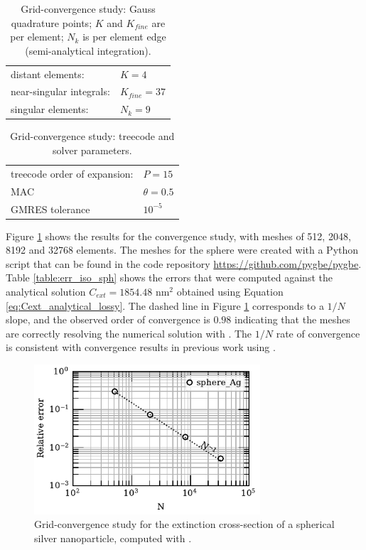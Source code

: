 \begin{table}[h]
    \centering
    \caption{\label{table:quadparams1} Grid-convergence study: Gauss quadrature points; 
    $K$ and $K_{fine}$ are per element; $N_k $ is per element edge (semi-analytical integration). } 
    \begin{tabular}{l l}
    \hline%
     distant elements: & $K=4$ \\
     near-singular integrals:   & $ K_{fine}=37$ \\
     singular elements:  & $N_k =9$ \\
    \hline%
    \end{tabular}
\end{table}
%
\begin{table}[h]
    \centering
    \caption{\label{table:treeparams1} Grid-convergence study: treecode and solver parameters.} 
    \begin{tabular}{l l}
    \hline%
    treecode order of expansion: & $P=15$\\
    MAC                          & $\theta=0.5$\\
    GMRES tolerance                    & $10^{-5}$\\
    \hline%
    \end{tabular}
\end{table}
%
Figure \ref{fig:conv_iso_sph} shows the results for the convergence study, with meshes of 512, 2048, 
8192 and 32768 elements. The meshes for the sphere were created with a Python script that can be found in the
code repository \url{https://github.com/pygbe/pygbe}. Table \ref{table:err_iso_sph} shows the errors that were computed against
the analytical solution $C_{ext} = 1854.48$ nm$^2$ obtained using Equation \eqref{eq:Cext_analytical_lossy}.
The dashed line in Figure \ref{fig:conv_iso_sph} corresponds to a $1/N$ slope, and the observed order of 
convergence is $0.98$ indicating that the meshes are correctly resolving the numerical solution with \pygbe.
The $1/N$ rate of convergence is consistent with convergence results in
previous work using \pygbe \cite{CooperBardhanBarba2013}. 

\begin{figure}%
    \centering
    \includegraphics[width=0.75\textwidth]{convergence_sph_Ag_R8_w380.pdf} 
    \caption{Grid-convergence study for the extinction cross-section of a spherical silver
             nanoparticle, computed with \pygbe.}
    \label{fig:conv_iso_sph}
 \end{figure}
 
